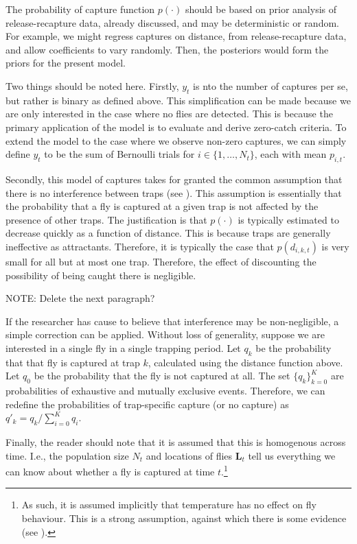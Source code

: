 \documentclass[
  oneside]{book}
\begin{document}
The probability of capture function \(p(\cdot)\) should be based on prior analysis of release-recapture data, already discussed, and may be deterministic or random. For example, we might regress captures on distance, from release-recapture data, and allow coefficients to vary randomly. Then, the posteriors would form the priors for the present model.

Two things should be noted here. Firstly, \(y_t\) is nto the number of captures per se, but rather is binary as defined above. This simplification can be made because we are only interested in the case where no flies are detected. This is because the primary application of the model is to evaluate and derive zero-catch criteria. To extend the model to the case where we observe non-zero captures, we can simply define \(y_t\) to be the sum of Bernoulli trials for \(i \in \{1, \ldots, N_t\}\), each with mean \(p_{i,t}\).

Secondly, this model of captures takes for granted the common assumption that there is no interference between traps (see \citet{todocite}). This assumption is essentially that the probability that a fly is captured at a given trap is not affected by the presence of other traps. The justification is that \(p(\cdot)\) is typically estimated to decrease quickly as a function of distance. This is because traps are generally ineffective as attractants. Therefore, it is typically the case that \(p(d_{i, k, t})\) is very small for all but at most one trap. Therefore, the effect of discounting the possibility of being caught there is negligible.

NOTE: Delete the next paragraph?

If the researcher has cause to believe that interference may be non-negligible, a simple correction can be applied. Without loss of generality, suppose we are interested in a single fly in a single trapping period. Let \(q_k\) be the probability that that fly is captured at trap \(k\), calculated using the distance function above. Let \(q_0\) be the probability that the fly is not captured at all. The set \(\{q_k\}_{k=0}^K\) are probabilities of exhaustive and mutually exclusive events. Therefore, we can redefine the probabilities of trap-specific capture (or no capture) as \(q'_k = q_k / \sum_{i=0}^K q_i\).

Finally, the reader should note that it is assumed that this is homogenous across time. I.e., the population size \(N_t\) and locations of flies \(\mathbf L_t\) tell us everything we can know about whether a fly is captured at time \(t\).\footnote{As such, it is assumed implicitly that temperature has no effect on fly behaviour. This is a strong assumption, against which there is some evidence (see \citet{bali2021}).}
\end{document}
